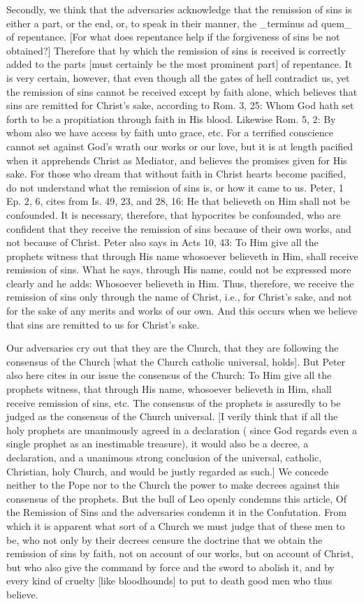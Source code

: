Secondly, we think that the adversaries acknowledge that the
remission of sins is either a part, or the end, or, to speak in their
manner, the _terminus ad quem_ of repentance.  [For what does
repentance help if the forgiveness of sins be not obtained?]
Therefore that by which the remission of sins is received is
correctly added to the parts [must certainly be the most prominent
part] of repentance.  It is very certain, however, that even though
all the gates of hell contradict us, yet the remission of sins cannot
be received except by faith alone, which believes that sins are
remitted for Christ's sake, according to Rom. 3, 25: Whom God hath
set forth to be a propitiation through faith in His blood.  Likewise
Rom. 5, 2: By whom also we have access by faith unto grace, etc. For
a terrified conscience cannot set against God's wrath our works or
our love, but it is at length pacified when it apprehends Christ as
Mediator, and believes the promises given for His sake.  For those
who dream that without faith in Christ hearts become pacified, do not
understand what the remission of sins is, or how it came to us.
Peter, 1 Ep. 2, 6, cites from Is. 49, 23, and 28, 16: He that
believeth on Him shall not be confounded.  It is necessary, therefore,
that hypocrites be confounded, who are confident that they receive
the remission of sins because of their own works, and not because of
Christ.  Peter also says in Acts 10, 43: To Him give all the prophets
witness that through His name whosoever believeth in Him, shall
receive remission of sins.  What he says, through His name, could not
be expressed more clearly and he adds: Whosoever believeth in Him.
Thus, therefore, we receive the remission of sins only through the
name of Christ, i.e., for Christ's sake, and not for the sake of any
merits and works of our own.  And this occurs when we believe that
sins are remitted to us for Christ's sake.

Our adversaries cry out that they are the Church, that they are
following the consensus of the Church [what the Church catholic
universal, holds].  But Peter also here cites in our issue the
consensus of the Church: To Him give all the prophets witness, that
through His name, whosoever believeth in Him, shall receive remission
of sins, etc. The consensus of the prophets is assuredly to be judged
as the consensus of the Church universal.  [I verily think that if
all the holy prophets are unanimously agreed in a declaration ( since
God regards even a single prophet as an inestimable treasure), it
would also be a decree, a declaration, and a unanimous strong
conclusion of the universal, catholic, Christian, holy Church, and
would be justly regarded as such.] We concede neither to the Pope nor
to the Church the power to make decrees against this consensus of the
prophets.  But the bull of Leo openly condemns this article, Of the
Remission of Sins and the adversaries condemn it in the Confutation.
From which it is apparent what sort of a Church we must judge that of
these men to be, who not only by their decrees censure the doctrine
that we obtain the remission of sins by faith, not on account of our
works, but on account of Christ, but who also give the command by
force and the sword to abolish it, and by every kind of cruelty [like
bloodhounds] to put to death good men who thus believe.

